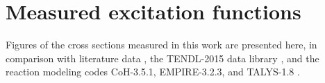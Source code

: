 \documentclass[3p]{elsarticle}
\newcommand{\comment}[1]{\todo[color=blue!20!white,inline]{ASV: #1}}
\begin{document}
% 
% 
\section{Measured excitation functions} \label{fit_figures}

Figures of the cross sections measured in this work are presented here, in comparison with literature data \cite{Albouy1963,PhysRev.162.1055,PhysRevC.6.1235,Grutter1982,Greenwood1984,Aleksandrov1987,levkovski1991cross,Mills1992,MICHEL1997153,Fassbender1997,Ido2002,sisterson2002selected,YashimaH2003,A2006,Ditroi2008,Ditroi2009,steyn2011excitation,Titarenko2011,Shahid2015,Garrido2016,Graves2016}, the TENDL-2015 data library \cite{Koning2012}, and the reaction modeling codes CoH-3.5.1, EMPIRE-3.2.3, and TALYS-1.8 \cite{KAWANO2010,Herman2007,Koning2012}.





\end{document}
